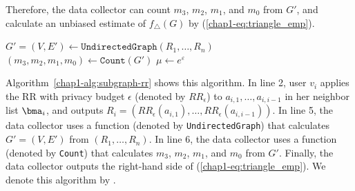 Therefore, the data collector can count $m_3$, $m_2$, $m_1$, and $m_0$ from $G'$, and calculate an unbiased estimate of $f_\triangle(G)$ by (\ref{chap1-eq:triangle_emp}). 

\begin{algorithm}
  \SetAlgoLined
  $G'=(V,E') \leftarrow \texttt{UndirectedGraph}(R_1, \ldots, R_n)$\;
  $(m_3, m_2, m_1, m_0) \leftarrow \texttt{Count}(G')$\;
  $\mu \leftarrow e^\varepsilon$\;

  \caption{\label{chap1-alg:subgraph-rr}}
\end{algorithm}

Algorithm~\ref{chap1-alg:subgraph-rr} shows this algorithm. 
In line 2, user $v_i$ applies the RR with privacy budget $\epsilon$ (denoted by $RR_\epsilon$) to $a_{i,1}, \ldots, a_{i,i-1}$ 
in her neighbor list $\bma_i$, and outputs $R_i = (RR_\epsilon(a_{i,1}), \ldots, RR_\epsilon(a_{i,i-1}))$. 
In line 5, the data collector uses a function (denoted by \texttt{UndirectedGraph}) that calculates $G'=(V,E')$ from $(R_1, \ldots, R_n)$. 
In line 6, the data collector uses a function (denoted by 
\texttt{Count}) that calculates $m_3$, $m_2$, $m_1$, and $m_0$ from $G'$. 
Finally, the data collector outputs the right-hand side of (\ref{chap1-eq:triangle_emp}). 
We denote this algorithm by .



